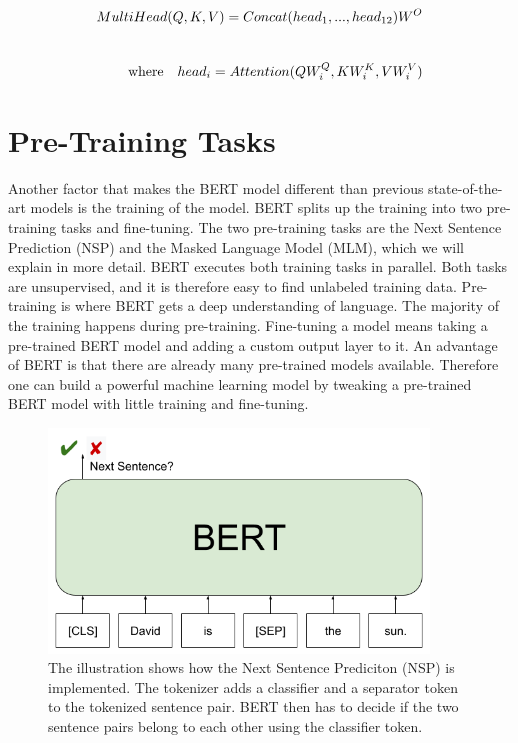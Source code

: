 \begin{equation}
\setlength{\jot}{25pt}
    \begin{aligned}
        MultiHead(Q,K,V)=Concat(head_1,...,head_{12})W^O \\
        \quad\text{where}\quad head_i=Attention(QW^Q_i,KW^K_i,VW^V_i)
    \end{aligned}
    \label{equation:multi_head_attention}
\end{equation}


\section{Pre-Training Tasks}
\label{sec:bert_tasks}
Another factor that makes the BERT model different than previous state-of-the-art models is the training of the model. BERT splits up the training into two pre-training tasks and fine-tuning. The two pre-training tasks are the Next Sentence Prediction (NSP) and the Masked Language Model (MLM), which we will explain in more detail. BERT executes both training tasks in parallel. Both tasks are unsupervised, and it is therefore easy to find unlabeled training data. Pre-training is where BERT gets a deep understanding of language. The majority of the training happens during pre-training. Fine-tuning a model means taking a pre-trained BERT model and adding a custom output layer to it. An advantage of BERT is that there are already many pre-trained models available. Therefore one can build a powerful machine learning model by tweaking a pre-trained BERT model with little training and fine-tuning. 

\begin{figure}[htbp]
\centering
\includegraphics[width=0.9\textwidth]{images/illustrations/bert_nsp.png}
\caption{The illustration shows how the Next Sentence Prediciton (NSP) is implemented. The tokenizer adds a classifier and a separator token to the tokenized sentence pair. BERT then has to decide if the two sentence pairs belong to each other using the classifier token.}
\label{fig:bert_nsp}
\end{figure}

